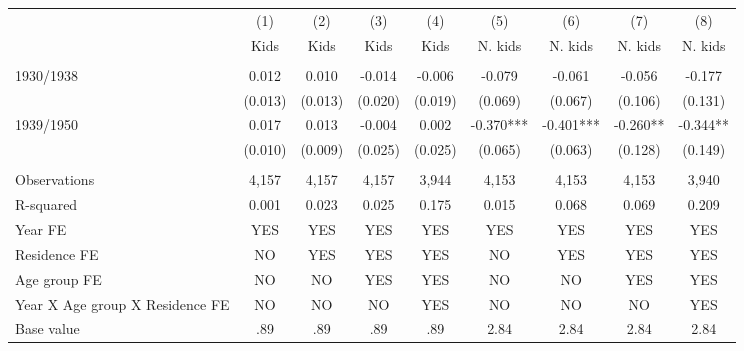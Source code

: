 \begin{tabular}{lcccccccc} \hline
 & (1) & (2) & (3) & (4) & (5) & (6) & (7) & (8) \\
 & Kids & Kids & Kids & Kids & N. kids & N. kids & N. kids & N. kids \\ \hline
 &  &  &  &  &  &  &  &  \\
1930/1938 & 0.012 & 0.010 & -0.014 & -0.006 & -0.079 & -0.061 & -0.056 & -0.177 \\
 & (0.013) & (0.013) & (0.020) & (0.019) & (0.069) & (0.067) & (0.106) & (0.131) \\
1939/1950 & 0.017 & 0.013 & -0.004 & 0.002 & -0.370*** & -0.401*** & -0.260** & -0.344** \\
 & (0.010) & (0.009) & (0.025) & (0.025) & (0.065) & (0.063) & (0.128) & (0.149) \\
 &  &  &  &  &  &  &  &  \\
Observations & 4,157 & 4,157 & 4,157 & 3,944 & 4,153 & 4,153 & 4,153 & 3,940 \\
R-squared & 0.001 & 0.023 & 0.025 & 0.175 & 0.015 & 0.068 & 0.069 & 0.209 \\
Year FE & YES & YES & YES & YES & YES & YES & YES & YES \\
Residence FE & NO & YES & YES & YES & NO & YES & YES & YES \\
Age group FE & NO & NO & YES & YES & NO & NO & YES & YES \\
Year X Age group X Residence FE & NO & NO & NO & YES & NO & NO & NO & YES \\

 Base value & .89 & .89 & .89 & .89 & 2.84 & 2.84 & 2.84 & 2.84 \\ \hline
\end{tabular}
